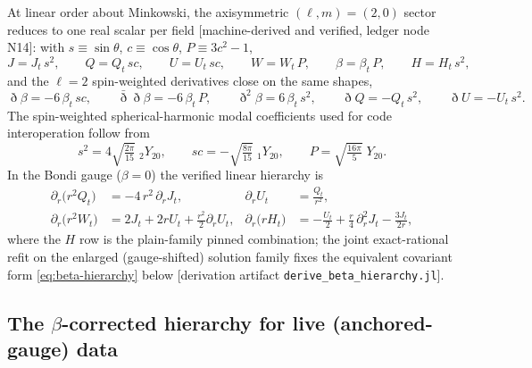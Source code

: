 \begin{nfblock}
At linear order about Minkowski, the axisymmetric $(\ell,m)=(2,0)$
sector reduces to one real scalar per field [machine-derived and
verified, ledger node N14]: with $s\equiv\sin\theta$,
$c\equiv\cos\theta$, $P\equiv 3c^2-1$,
\begin{equation}
J = J_t\,s^2,\qquad
Q = Q_t\,sc,\qquad
U = U_t\,sc,\qquad
W = W_t\,P,\qquad
\beta = \beta_t\,P,\qquad
H = H_t\,s^2,
\label{eq:tscalars}
\end{equation}
and the $\ell=2$ spin-weighted derivatives close on the same shapes,
\begin{equation}
\eth\beta = -6\,\beta_t\,sc,\qquad
\bar\eth\eth\beta = -6\,\beta_t\,P,\qquad
\eth^2\beta = 6\,\beta_t\,s^2,\qquad
\eth Q = -Q_t\,s^2,\qquad
\eth U = -U_t\,s^2 .
\label{eq:ethclosure}
\end{equation}
The spin-weighted spherical-harmonic modal coefficients used for code
interoperation follow from
\begin{equation}
s^2 = 4\sqrt{\tfrac{2\pi}{15}}\;{}_{2}Y_{20},\qquad
sc = -\sqrt{\tfrac{8\pi}{15}}\;{}_{1}Y_{20},\qquad
P = \sqrt{\tfrac{16\pi}{5}}\;Y_{20}.
\label{eq:modalfactors}
\end{equation}
In the Bondi gauge ($\beta = 0$) the verified linear hierarchy is
\begin{align}
\partial_r\big(r^2 Q_t\big) &= -4\,r^2\,\partial_r J_t,
&
\partial_r U_t &= \frac{Q_t}{r^2},
\nonumber\\
\partial_r\big(r^2 W_t\big) &= 2J_t + 2rU_t + \frac{r^2}{2}\partial_r U_t,
&
\partial_r\big(r H_t\big) &= -\frac{U_t}{2}
 + \frac{r}{4}\,\partial_r^2 J_t - \frac{3J_t}{2r},
\label{eq:plainhierarchy}
\end{align}
where the $H$ row is the plain-family pinned combination; the joint
exact-rational refit on the enlarged (gauge-shifted) solution family
fixes the equivalent covariant form \eqref{eq:beta-hierarchy} below
[derivation artifact \texttt{derive\_beta\_hierarchy.jl}].
\end{nfblock}

\subsection{The $\beta$-corrected hierarchy for live (anchored-gauge) data}
\label{sec:betahierarchy}

